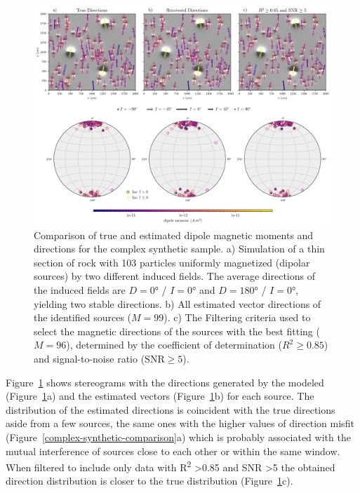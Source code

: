 \begin{figure}[tb!]
\centering
\includegraphics[width=1\linewidth]{figures/complex-synthetic-stereograms.png}
\caption{ Comparison of true and estimated dipole magnetic moments and directions for the complex synthetic sample.
a) Simulation of a thin section of rock with 103 particles uniformly magnetized (dipolar sources) by two different induced fields. The average directions of the induced fields are $D=\ang{0}$ / $I=\ang{0}$ and $D=\ang{180}$ / $I=\ang{0}$, yielding two stable directions. b) All estimated vector directions of the identified sources ($M=99$). c) The Filtering criteria used to select the magnetic directions of the sources with the best fitting ($M=96$), determined by the coefficient of determination ($R^2 \geq 0.85$) and signal-to-noise ratio ($\text{SNR} \geq 5$).
}
\label{complex-synthetic-stereograms}
\end{figure}

Figure~\ref{complex-synthetic-stereograms} shows stereograms with the directions generated by the modeled (Figure~\ref{complex-synthetic-stereograms}a) and the estimated vectors (Figure~\ref{complex-synthetic-stereograms}b) for each source. The distribution of the estimated directions is coincident with the true directions aside from a few sources, the same ones with the higher values of direction misfit (Figure~\ref{complex-synthetic-comparison}a) which is probably associated with the mutual interference of sources close to each other or within the same window. When filtered to include only data with R\textsuperscript{2} \textgreater 0.85 and SNR \textgreater 5 the obtained direction distribution is closer to the true distribution (Figure~\ref{complex-synthetic-stereograms}c).


